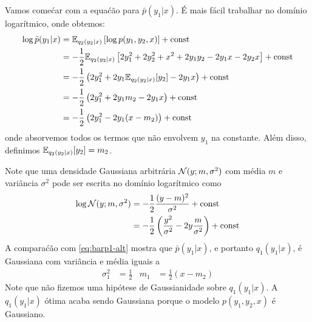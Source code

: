 \begin{exenumerate}
\begin{solution}
        Vamos come\'car com a equa\'c\~ao para $\bar{p}(y_1|x)$. \'E mais f\'acil trabalhar no dom\'inio logar\'itmico, onde obtemos:
        \begin{align}
            \log  \bar{p}(y_1|x) & =  \mathbb{E}_{q_2(y_2|x)}\left[ \log p(y_1, y_2, x)\right] + \text{const}\\
            & = -\frac{1}{2} \mathbb{E}_{q_2(y_2|x)}\left[  2 y_1^2 + 2 y_2^2 + x^2 + 2 y_1 y_2 - 2 y_1 x - 2y_2 x \right] + \text{const}\\
            & = -\frac{1}{2} \left(2 y_1^2 + 2 y_1 \mathbb{E}_{q_2(y_2|x)}[y_2] - 2 y_1 x \right) + \text{const}\\
            & = -\frac{1}{2} \left( 2 y_1^2 + 2y_1 m_2 - 2 y_1 x \right) + \text{const}\\
            & = -\frac{1}{2} \left( 2 y_1^2 - 2 y_1 (x-m_2) \right) + \text{const}
            \label{eq:barp1-alt}
        \end{align}
        onde absorvemos todos os termos que n\~ao envolvem $y_1$ na constante. Al\'em disso, definimos $\mathbb{E}_{q_2(y_2|x)}[y_2]=m_2$.
        
        Note que uma densidade Gaussiana arbitr\'aria $\mathcal{N}(y; m, \sigma^2)$
        com m\'edia $m$ e vari\^ancia $\sigma^2$ pode ser escrita no
        dom\'inio logar\'itmico como
        \begin{align}
            \log \mathcal{N}(y; m, \sigma^2) & = -\frac{1}{2}\frac{(y-m)^2}{\sigma^2} + \text{const}\\
            & = -\frac{1}{2} \left( \frac{y^2}{\sigma^2} -2y \frac{m}{\sigma^2} \right) + \text{const}
            \label{eq:loggauss-alt}
        \end{align}
        A compara\'c\~ao com \eqref{eq:barp1-alt} mostra que $\bar{p}(y_1|x)$, e
        portanto $q_1(y_1 | x)$, \'e Gaussiana com vari\^ancia e m\'edia iguais a
        \begin{align}
            \sigma_1^2 &= \frac{1}{2} & m_1 & = \frac{1}{2}(x-m_2)
        \end{align}
        Note que n\~ao fizemos uma hip\'otese de Gaussianidade sobre $q_1(y_1 |
        x)$. A $q_1(y_1 | x)$ \'otima acaba sendo Gaussiana porque
        o modelo $p(y_1, y_2, x)$ \'e Gaussiano.
        

\end{solution}
\end{exenumerate}
